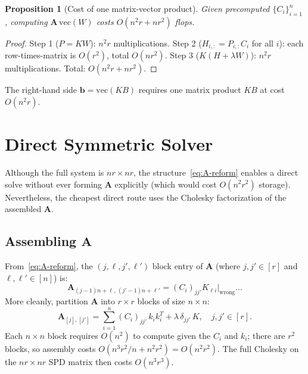 \documentclass[12pt]{article}
\newtheorem{proposition}{Proposition}
\theoremstyle{definition}
\begin{document}
\begin{proposition}[Cost of one matrix-vector product]
Given precomputed $\{C_i\}_{i=1}^n$, computing $\mathbf{A}\,\mathrm{vec}(W)$ costs $O(n^2 r + nr^2)$ flops.
\end{proposition}
\begin{proof}
Step 1 ($P = KW$): $n^2 r$ multiplications. Step 2 ($H_{i,:} = P_{i,:}C_i$ for all $i$): each row-times-matrix is $O(r^2)$, total $O(nr^2)$. Step 3 ($K(H+\lambda W)$): $n^2 r$ multiplications. Total: $O(n^2r + nr^2)$.
\end{proof}

The right-hand side $\mathbf{b} = \mathrm{vec}(KB)$ requires one matrix product $KB$ at cost $O(n^2 r)$.

\section{Direct Symmetric Solver}\label{sec:direct}

Although the full system is $nr \times nr$, the structure~\eqref{eq:A-reform} enables a direct solve without ever forming $\mathbf{A}$ explicitly (which would cost $O(n^2r^2)$ storage). Nevertheless, the cheapest direct route uses the Cholesky factorization of the assembled $\mathbf{A}$.

\subsection{Assembling $\mathbf{A}$}

From~\eqref{eq:A-reform}, the $(j,\ell,j',\ell')$ block entry of $\mathbf{A}$ (where $j,j'\in[r]$ and $\ell,\ell'\in[n]$) is:
\[
\mathbf{A}_{(j-1)n+\ell,\,(j'-1)n+\ell'} = (C_i)_{jj'} K_{\ell i}\big|_{\text{wrong}} \ldots
\]
More cleanly, partition $\mathbf{A}$ into $r \times r$ blocks of size $n \times n$:
\[
\mathbf{A}_{[j],[j']} = \sum_{i=1}^n (C_i)_{jj'}\,k_i k_i^T + \lambda\,\delta_{jj'}\,K, \quad j,j'\in[r].
\]
Each $n\times n$ block requires $O(n^2)$ to compute given the $C_i$ and $k_i$; there are $r^2$ blocks, so assembly costs $O(n^3 r^2 / n + n^2 r^2) = O(n^2 r^2)$. The full Cholesky on the $nr\times nr$ SPD matrix then costs $O(n^3r^3)$.

\medskip
\end{document}
